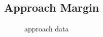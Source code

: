 \clearpage
\subsection{Approach Margin}
\begin{figure}[]
	\centering
	\caption{approach data}
	\label{fig:approach-data}
\end{figure}



%
%
%





